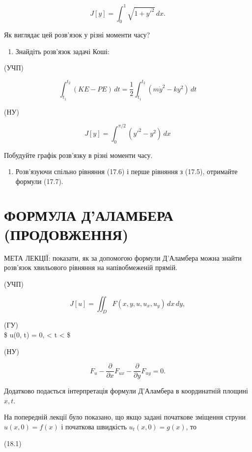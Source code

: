 \documentclass[
  ukrainian,
]{article}
\providecommand{\tightlist}{%
  \setlength{\itemsep}{0pt}\setlength{\parskip}{0pt}}
\begin{document}
\[
J[y] = \int_{0}^{1} \sqrt{1 + y'^{2}}\,dx.
\]

Як виглядає цей розв'язок у різні моменти часу?

\begin{enumerate}
\def\labelenumi{\arabic{enumi}.}
\setcounter{enumi}{3}
\tightlist
\item
  Знайдіть розв'язок задачі Коші:
\end{enumerate}

(УЧП)

\[
\int_{t_{1}}^{t_{2}} (KE - PE)\,dt = \frac{1}{2} \int_{t_{1}}^{t_{2}} (m\dot{y}^{2} - ky^{2})\,dt
\]

(НУ)

\[
J[y] = \int_{0}^{\pi/2} (y'^{2} - y^{2})\,dx
\]

Побудуйте графік розв'язку в різні моменти часу.

\begin{enumerate}
\def\labelenumi{\arabic{enumi}.}
\setcounter{enumi}{4}
\tightlist
\item
  Розв'язуючи спільно рівняння (17.6) і перше рівняння з (17.5),
  отримайте формули (17.7).
\end{enumerate}

\section{ФОРМУЛА Д'АЛАМБЕРА
(ПРОДОВЖЕННЯ)}\label{ux444ux43eux440ux43cux443ux43bux430-ux434ux430ux43bux430ux43cux431ux435ux440ux430-ux43fux440ux43eux434ux43eux432ux436ux435ux43dux43dux44f}

МЕТА ЛЕКЦІЇ: показати, як за допомогою формули Д'Аламбера можна знайти
розв'язок хвильового рівняння на напівобмеженій прямій.

(УЧП)

\[
J[u] = \iint_D F(x, y, u, u_x, u_y)\,dx\,dy,
\]

(ГУ)\\
\$ u(0, t) = 0, \textless{} t \textless{} \infty \$

(НУ)

\[
F_u - \frac{\partial}{\partial x}F_{ux} - \frac{\partial}{\partial y}F_{uy} = 0.
\]

Додатково подається інтерпретація формули Д'Аламбера в координатній
площині \(x, t\).

На попередній лекції було показано, що якщо задані початкове зміщення
струни \(u(x,0)=f(x)\) і початкова швидкість \(u_t(x,0)=g(x)\), то

(18.1)
\end{document}
